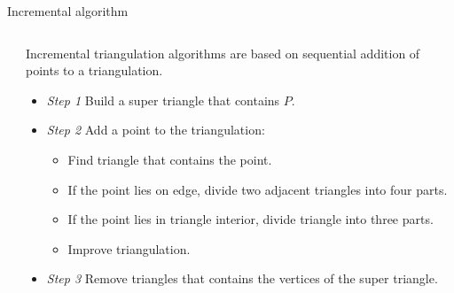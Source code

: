 \documentclass[10pt]{beamer}
\begin{document}
\begin{frame}{Incremental algorithm}
\begin{columns}
		\begin{column}{0.4\textwidth} 
		\end{column}
		\begin{column}{0.6\textwidth}
			\alert{Incremental triangulation} algorithms are based on sequential addition of points 
			to a triangulation.  
			\begin{itemize}
				\item \textit{Step 1} Build a \alert{super triangle} that contains $P$.
				\item \textit{Step 2} Add a point to the triangulation:
					\begin{itemize}
						\item Find triangle that contains the point.
						\item If the point lies on edge, divide two adjacent triangles into four parts.
						\item If the point lies in triangle interior, divide triangle into three parts.
						\item Improve triangulation.
					\end{itemize}
				\item \textit{Step 3} Remove triangles that contains the vertices of the super triangle.
			\end{itemize}
		\end{column}
		
	\end{columns} 

\end{frame}
 
\end{document}

